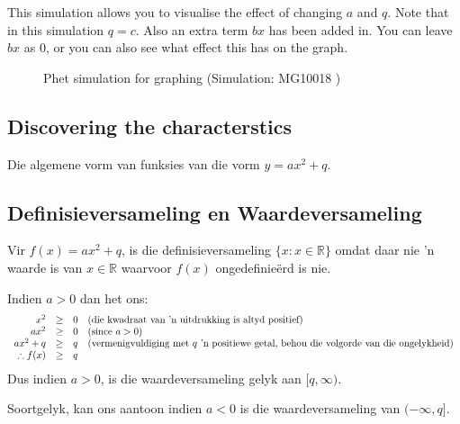 This simulation allows you to visualise the effect of changing $a$ and $q$. Note that in this simulation $q = c$. Also an extra term $bx$ has been added in. You can leave $bx$ as $0$, or you can also see what effect this has on the graph.
\par 
\setcounter{subfigure}{0}
\begin{figure}[H] %
\textnormal{Phet simulation for graphing}\vspace{.1in} \nopagebreak
\label{m39345*phet!!!underscore!!!sim}\label{m39345*phet-simulation}
 { (Simulation:  MG10018 )}
\vspace{2pt}
\vspace{.1in}
\end{figure}       


\subsection*{Discovering the characterstics}
Die algemene vorm van funksies van die vorm  $y=ax^{2} + q$.
\subsection*{Definisieversameling en Waardeversameling}

Vir $f(x)=a{x}^{2}+q$, is die definisieversameling $\{x:x\in \mathbb{R}\}$ omdat daar nie ’n waarde is van $x\in \mathbb{R}$ waarvoor $f(x)$ ongedefinieërd is nie.\par 
\par 
Indien $a>0$ dan het ons:
\begin{equation*}
\begin{array}{cccl}\hfill {x}^{2}& \ge & 0\hfill & (\mbox{die kwadraat van ’n uitdrukking is altyd positief})\hfill \\
 \hfill a{x}^{2}& \ge & 0\hfill & (\mbox{since } a>0)\hfill \\
 \hfill a{x}^{2}+q& \ge & q\hfill & (\mbox{vermenigvuldiging met $q$ ’n positiewe getal, behou die volgorde van die ongelykheid}) \\
 \hfill \therefore f(x)& \ge & q\hfill & 
\end{array}
\end{equation*}
Dus indien $a>0$, is die waardeversameling gelyk aan $[q,\infty )$.\par 
Soortgelyk, kan ons aantoon indien  $a<0$ is die waardeversameling van $ (-\infty ,q]$. 

